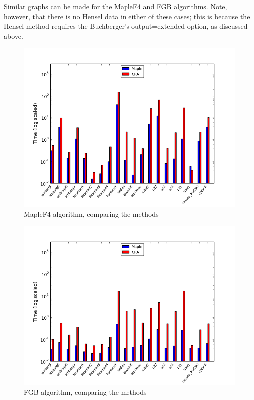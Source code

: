 \documentclass[letterpaper,12pt,titlepage,oneside,final]{book}
\begin{document}
Similar graphs can be made for the MapleF4 and FGB algorithms.  Note, however, that there is no Hensel data in either of these cases; this is because the Hensel method requires the Buchberger's output=extended option, as discussed above.

\begin{figure}[H]
  \centering
  \includegraphics[scale=0.7]{f4_tests.png}
  \caption{MapleF4 algorithm, comparing the methods \label{fig:f4_tests}}
\end{figure}

\begin{figure}[H]
  \centering
  \includegraphics[scale=0.7]{fgb_tests.png}
  \caption{FGB algorithm, comparing the methods \label{fig:fgb_tests}}
\end{figure}
\end{document}
